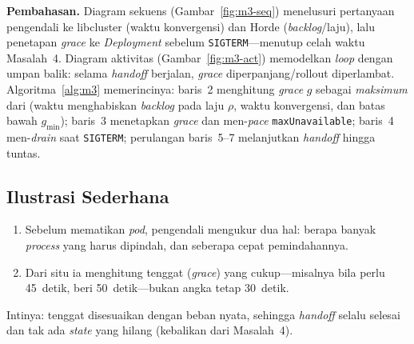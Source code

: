 \noindent\textbf{Pembahasan.} Diagram sekuens (Gambar~\ref{fig:m3-seq}) menelusuri
pertanyaan pengendali ke libcluster (waktu konvergensi) dan Horde (\emph{backlog}/laju),
lalu penetapan \emph{grace} ke \emph{Deployment} sebelum \texttt{SIGTERM}---menutup celah
waktu Masalah~4. Diagram aktivitas (Gambar~\ref{fig:m3-act}) memodelkan \emph{loop} dengan
umpan balik: selama \emph{handoff} berjalan, \emph{grace} diperpanjang/rollout diperlambat.
Algoritma~\ref{alg:m3} memerincinya: baris~2 menghitung \emph{grace} $g$ sebagai
\emph{maksimum} dari (waktu menghabiskan \emph{backlog} pada laju $\rho$, waktu
konvergensi, dan batas bawah $g_{\min}$); baris~3 menetapkan \emph{grace} dan men-\emph{pace}
\texttt{maxUnavailable}; baris~4 men-\emph{drain} saat \texttt{SIGTERM}; perulangan
baris~5--7 melanjutkan \emph{handoff} hingga tuntas.

\subsection{Ilustrasi Sederhana}
\label{subsec:m3-ilustrasi}
\begin{enumerate}[nosep,leftmargin=2em]
  \item Sebelum mematikan \emph{pod}, pengendali mengukur dua hal: berapa banyak
        \emph{process} yang harus dipindah, dan seberapa cepat pemindahannya.
  \item Dari situ ia menghitung tenggat (\emph{grace}) yang cukup---misalnya bila perlu
        45~detik, beri 50~detik---bukan angka tetap 30~detik.
\end{enumerate}
\noindent Intinya: tenggat disesuaikan dengan beban nyata, sehingga \emph{handoff} selalu
selesai dan tak ada \emph{state} yang hilang (kebalikan dari Masalah~4).

